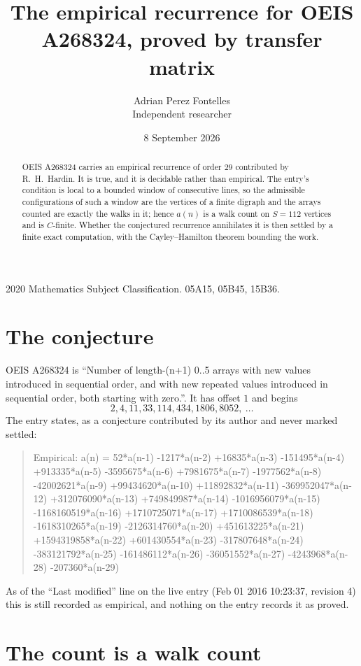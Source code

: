 \documentclass[11pt,a4paper]{article}
\title{The empirical recurrence for OEIS A268324, proved by transfer matrix}
\author{Adrian Perez Fontelles\\ \small Independent researcher}
\date{8 September 2026}
\theoremstyle{plain}
\theoremstyle{definition}
\begin{document}
\maketitle

\begin{abstract}
OEIS A268324 carries an empirical recurrence of order $29$ contributed by R.~H.~Hardin. It is
true, and it is decidable rather than empirical. The entry's condition is local to a bounded window of consecutive lines, so
the admissible configurations of such a window are the vertices of a finite digraph and the
arrays counted are exactly the walks in it; hence $a(n)$ is a walk count on $S=112$ vertices
and is $C$-finite. Whether the conjectured recurrence annihilates it is then settled by a
finite exact computation, with the Cayley--Hamilton theorem bounding the work.
\end{abstract}

\noindent\small 2020 Mathematics Subject Classification. 05A15, 05B45, 15B36.\normalsize

\section{The conjecture}

OEIS A268324 is ``Number of length-(n+1) 0..5 arrays with new values introduced in sequential order, and with new repeated values introduced in sequential order, both starting with zero.''. It has offset $1$ and begins
\[
2, 4, 11, 33, 114, 434, 1806, 8052,\ \dots
\]
The entry states, as a conjecture contributed by its author and never marked settled:
\begin{quote}
Empirical: a(n) = 52*a(n-1) -1217*a(n-2) +16835*a(n-3) -151495*a(n-4) +913335*a(n-5) -3595675*a(n-6) +7981675*a(n-7) -1977562*a(n-8) -42002621*a(n-9) +99434620*a(n-10) +11892832*a(n-11) -369952047*a(n-12) +312076090*a(n-13) +749849987*a(n-14) -1016956079*a(n-15) -1168160519*a(n-16) +1710725071*a(n-17) +1710086539*a(n-18) -1618310265*a(n-19) -2126314760*a(n-20) +451613225*a(n-21) +1594319858*a(n-22) +601430554*a(n-23) -317807648*a(n-24) -383121792*a(n-25) -161486112*a(n-26) -36051552*a(n-27) -4243968*a(n-28) -207360*a(n-29)
\end{quote}
As of the ``Last modified'' line on the live entry (Feb 01 2016 10:23:37, revision 4) this is still
recorded as empirical, and nothing on the entry records it as proved.

\section{The count is a walk count}
\end{document}
